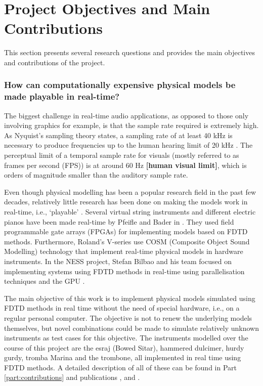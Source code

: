 \section{Project Objectives and Main Contributions}
This section presents several research questions and provides the main objectives and contributions of the project. 

\subsubsection{How can computationally expensive physical models be made playable in real-time?}

The biggest challenge in real-time audio applications, as opposed to those only involving graphics for example, is that the sample rate required is extremely high. As Nyquist's sampling theory states, a sampling rate of at least 40 kHz is necessary to produce frequencies up to the human hearing limit of 20 kHz \cite{Nyquist}. The perceptual limit of a temporal sample rate for visuals (mostly referred to as frames per second (FPS)) is at around 60 Hz \textbf{[human visual limit]}, which is orders of magnitude smaller than the auditory sample rate.

Even though physical modelling has been a popular research field in the past few decades, relatively little research has been done on making the models work in real-time, i.e., `playable’ \cite{Mehes2016}. Several virtual string instruments and different electric pianos have been made real-time by Pfeifle and Bader in \cite{Pfeifle2012, Pfeifle2015, Pfeifle2017}. They used field programmable gate arrays (FPGAs) for implementing models based on FDTD methods. Furthermore, Roland’s V-series use COSM (Composite Object Sound Modelling) technology \cite{Bybee2019} that implement real-time physical models in hardware instruments. In the NESS project, Stefan Bilbao and his team focused on implementing systems using FDTD methods in real-time using parallelisation techniques and the GPU \cite{Bilbao2019CMJa,Bilbao2019CMJb}. 

The main objective of this work is to implement physical models simulated using FDTD methods in real time without the need of special hardware, i.e., on a regular personal computer. The objective is not to renew the underlying models themselves, but novel combinations could be made to simulate relatively unknown instruments as test cases for this objective. The instruments modelled over the course of this project are the esraj (Bowed Sitar), hammered dulcimer, hurdy gurdy, tromba Marina and the trombone, all implemented in real time using FDTD methods. A detailed description of all of these can be found in Part \ref{part:contributions} and publications \citeP[A], \citeP[D] and \citeP[H].

